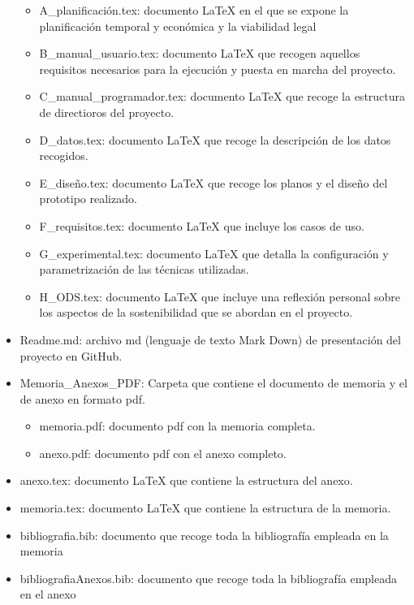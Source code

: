 \begin{itemize}
\begin{itemize}
        \item A\_planificación.tex: documento LaTeX en el que se expone la planificación temporal y económica y la viabilidad legal
        \item B\_manual\_usuario.tex: documento LaTeX que recogen aquellos requisitos necesarios para la ejecución y puesta en marcha del proyecto.
        \item C\_manual\_programador.tex: documento LaTeX que recoge la estructura de directioros del proyecto.
        \item D\_datos.tex: documento LaTeX que recoge la descripción de los datos recogidos.
        \item E\_diseño.tex: documento LaTeX que recoge los planos y el diseño del prototipo realizado.
        \item F\_requisitos.tex: documento LaTeX que incluye los casos de uso.
        \item G\_experimental.tex: documento LaTeX que detalla la configuración y parametrización de las técnicas utilizadas.
        \item H\_ODS.tex: documento LaTeX que incluye una reflexión personal sobre los aspectos de la sostenibilidad que se abordan en el proyecto.
    \end{itemize}
    \item Readme.md: archivo md (lenguaje de texto Mark Down) de presentación del proyecto en GitHub.
    \item Memoria\_Anexos\_PDF: Carpeta que contiene el documento de memoria y el de anexo en formato pdf.
    \begin{itemize}
        \item memoria.pdf: documento pdf con la memoria completa.
        \item anexo.pdf: documento pdf con el anexo completo.
    \end{itemize}
    \item anexo.tex: documento LaTeX que contiene la estructura del anexo.
    \item memoria.tex: documento LaTeX que contiene la estructura de la memoria.
    \item bibliografia.bib: documento que recoge toda la bibliografía empleada en la memoria
    \item bibliografiaAnexos.bib: documento que recoge toda la bibliografía empleada en el anexo
\end{itemize}
